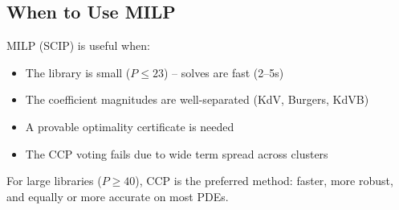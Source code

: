 \documentclass[11pt]{article}
\begin{document}
\subsection{When to Use MILP}

MILP (SCIP) is useful when:
\begin{itemize}
  \item The library is small ($P \le 23$) -- solves are fast (2--5s)
  \item The coefficient magnitudes are well-separated (KdV, Burgers,
    KdVB)
  \item A provable optimality certificate is needed
  \item The CCP voting fails due to wide term spread across clusters
\end{itemize}

For large libraries ($P \ge 40$), CCP is the preferred method: faster,
more robust, and equally or more accurate on most PDEs.
\end{document}
